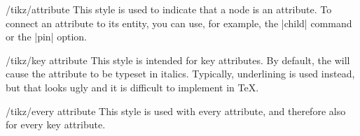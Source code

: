 \begin{stylekey}{/tikz/attribute}
    This style is used to indicate that a node is an attribute. To connect an
    attribute to its entity, you can use, for example, the |child| command or
    the |pin| option.
\begin{codeexample}[]
\end{codeexample}
\begin{codeexample}[]
\end{codeexample}
\end{stylekey}

\begin{stylekey}{/tikz/key attribute}
    This style is intended for key attributes. By default, the will cause the
    attribute to be typeset in italics. Typically, underlining is used instead,
    but that looks ugly and it is difficult to implement in \TeX.
\end{stylekey}

\begin{stylekey}{/tikz/every attribute}
    This style is used with every attribute, and therefore also for every key
    attribute.
\begin{codeexample}[]
\end{codeexample}
\end{stylekey}


